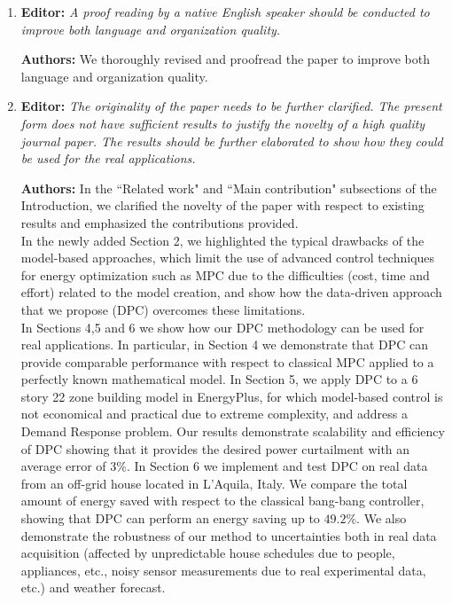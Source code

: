 \documentclass{article}
\begin{document}
\begin{enumerate}
	\item \textbf{Editor:} \textit{A proof reading by a native English speaker should be conducted to improve both language and organization quality.}



	\textbf{Authors:} We thoroughly revised and proofread the paper to improve both language and organization quality.



	\item \textbf{Editor:} \textit{The originality of the paper needs to be further clarified. The present form does not have sufficient results to justify the novelty of a high quality journal paper. The results should be further elaborated to show how they could be used for the real applications.}



	\textbf{Authors:} In the ``Related work" and ``Main contribution" subsections of the Introduction, we clarified the novelty of the paper with respect to existing results and emphasized the contributions provided.\\
	
		In the newly added Section 2, we highlighted the typical drawbacks of the model-based approaches, which limit the use of advanced control techniques for energy optimization such as MPC due to the difficulties (cost, time and effort) related to the model creation, and show how the data-driven approach that we propose (DPC) overcomes these limitations.\\
		
		In Sections 4,5 and 6 we show how our DPC methodology can be used for real applications. In particular, in Section 4 we demonstrate that DPC can provide comparable performance with respect to classical MPC applied to a perfectly known mathematical model. In Section 5, we apply DPC to a 6 story 22 zone building model in EnergyPlus, for which model-based control is not economical and practical due to extreme complexity, and address a Demand Response problem. Our results demonstrate scalability and efficiency of DPC showing that it provides the desired power curtailment with an average error of 3\%. In Section 6 we implement and test DPC on real data from an off-grid house located in L'Aquila, Italy. We compare the total amount of energy saved with respect to the classical bang-bang controller, showing that DPC can perform an energy saving up to $49.2\%$. We also demonstrate the robustness of our method to uncertainties both in real data acquisition (affected by unpredictable house schedules due to people, appliances, etc., noisy sensor measurements due to real experimental data, etc.) and weather forecast.
\end{enumerate}
\end{document}
